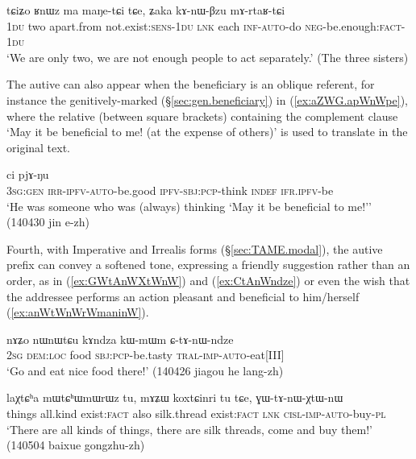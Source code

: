    \begin{exe}
\ex \label{ex:kAnWBzu.mArtaRtCi}
\gll tɕiʑo ʁnɯz ma maŋe-tɕi tɕe, ʑaka kɤ-nɯ-βzu mɤ-rtaʁ-tɕi \\
\textsc{1du} two apart.from not.exist:\textsc{sens}-\textsc{1du} \textsc{lnk} each \textsc{inf}-\textsc{auto}-do \textsc{neg}-be.enough:\textsc{fact}-\textsc{1du} \\
\glt `We are only two, we are not enough people to act separately.' (The three sisters)
\end{exe} 

The autive can also appear when the beneficiary is an oblique referent, for instance the genitively-marked  (§\ref{sec:gen.beneficiary}) in (\ref{ex:aZWG.apWnWpe}), where the relative (between square brackets) containing the complement clause  `May it be beneficial to me! (at the expense of others)' is used to translate  in the original text.

   \begin{exe}
\ex \label{ex:aZWG.apWnWpe}
 ci pjɤ-ŋu \\
\textsc{3sg}:\textsc{gen} \textsc{irr}-\textsc{ipfv}-\textsc{auto}-be.good \textsc{ipfv}-\textsc{sbj}:\textsc{pcp}-think \textsc{indef} \textsc{ifr}.\textsc{ipfv}-be   \\
\glt `He was someone who was (always) thinking `May it be beneficial to me!'' (140430 jin e-zh)
\end{exe} 

Fourth, with Imperative and Irrealis forms (§\ref{sec:TAME.modal}), the autive prefix can convey a softened tone, expressing a friendly suggestion rather than an order, as in   (\ref{ex:GWtAnWXtWnW}) and (\ref{ex:CtAnWndze}) or even the wish that the addressee performs an action pleasant and beneficial to him/herself (\ref{ex:anWtWnWrWmaninW}).


\begin{exe}
\ex \label{ex:CtAnWndze}
\gll nɤʑo nɯnɯtɕu kɤndza kɯ-mɯm ɕ-tɤ-nɯ-ndze  \\
\textsc{2sg} \textsc{dem}:\textsc{loc} food \textsc{sbj}:\textsc{pcp}-be.tasty \textsc{tral}-\textsc{imp}-\textsc{auto}-eat[III] \\
\glt `Go and eat nice food there!' (140426 jiagou he lang-zh)
\end{exe}

\begin{exe}
\ex \label{ex:GWtAnWXtWnW}
\gll laχtɕʰa mɯtɕʰɯmɯrɯz tu, mɤʑɯ koxtɕinri tu tɕe, ɣɯ-tɤ-nɯ-χtɯ-nɯ \\ 
things all.kind exist:\textsc{fact} also silk.thread exist:\textsc{fact} \textsc{lnk} \textsc{cisl}-\textsc{imp}-\textsc{auto}-buy-\textsc{pl} \\
\glt `There are all kinds of things, there are silk threads, come and buy them!' (140504 baixue gongzhu-zh) 
\end{exe}

